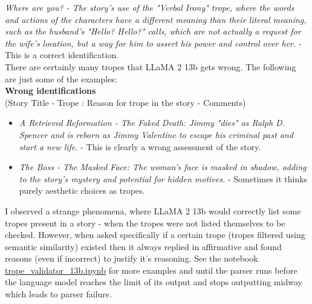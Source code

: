 \documentclass[11pt]{article}
\begin{document}
\textit{Where are you? - The story's use of the "Verbal Irony" trope, where the words and actions of the characters have a different meaning than their literal meaning, such as the husband's "Hello? Hello?" calls, which are not actually a request for the wife's location, but a way for him to assert his power and control over her.} - This is a correct identification.
\\
There are certainly many tropes that LLaMA 2 13b gets wrong. The following are just some of the examples:
\\
\textbf{Wrong identifications}\\
(Story Title - Trope : Reason for trope in the story - Comments)
\begin{itemize}
  \item \textit{A Retrieved Reformation - The Faked Death: Jimmy "dies" as Ralph D. Spencer and is reborn as Jimmy Valentine to escape his criminal past and start a new life.} - This is clearly a wrong assessment of the story.
  \item \textit{The Boss - The Masked Face: The woman's face is masked in shadow, adding to the story's mystery and potential for hidden motives.} - Sometimes it thinks purely aesthetic choices as tropes.
\end{itemize}
I observed a strange phenomena, where LLaMA 2 13b would correctly list some tropes present in a story - when the tropes were not listed themselves to be checked. However, when asked specifically if a certain trope (tropes filtered using semantic similarity) existed then it always replied in affirmative and found reasons (even if incorrect) to justify it's reasoning. 
See the notebook \href{https://github.com/armsp/trama/blob/main/trope_validator_13b.ipynb}{trope\_validator\_13b.ipynb} for more examples and until the parser runs before the language model reaches the limit of its output and stops outputting midway which leads to parser failure.

\end{document}
